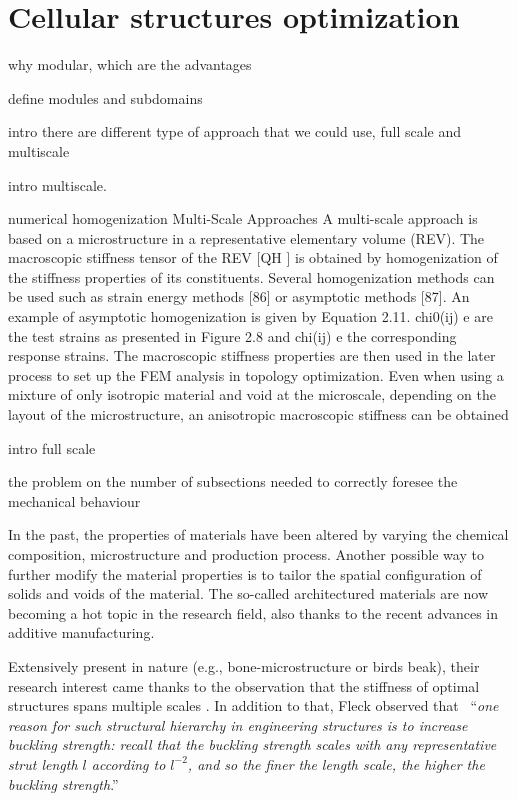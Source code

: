 \section{Cellular structures optimization}
why modular, which are the advantages

define modules and subdomains

intro there are different type of approach that we could use, full scale and multiscale

intro multiscale.

numerical homogenization
Multi-Scale Approaches
A multi-scale approach is based on a microstructure in a representative elementary volume (REV). The
macroscopic stiffness tensor of the REV [QH ] is obtained by homogenization of the stiffness properties of its
constituents. Several homogenization methods can be used such as strain energy methods [86] or asymptotic
methods [87]. An example of asymptotic homogenization is given by Equation 2.11. chi0(ij)
e are the test strains
as presented in Figure 2.8 and chi(ij)
e the corresponding response strains. The macroscopic stiffness properties
are then used in the later process to set up the FEM analysis in topology optimization. Even when using a
mixture of only isotropic material and void at the microscale, depending on the layout of the microstructure,
an anisotropic macroscopic stiffness can be obtained

intro full scale

the problem on the number of subsections needed to correctly foresee the mechanical behaviour

In the past, the properties of materials have been altered by varying the chemical composition, microstructure and production process. Another possible way to further modify the material properties is to tailor the spatial configuration of solids and voids of the material. The so-called architectured materials are now becoming a hot topic in the research field, also thanks to the recent advances in additive manufacturing.

Extensively present in nature (e.g., bone-microstructure or birds beak), their research interest came thanks to the observation that the stiffness of optimal structures spans multiple scales . In addition to that, Fleck observed that ~``\textit{one reason for such structural hierarchy in engineering structures is to increase buckling strength: recall that the buckling strength scales with any representative strut length $l$ according to $l^{-2}$, and so the finer the length scale, the higher the buckling strength}.''

